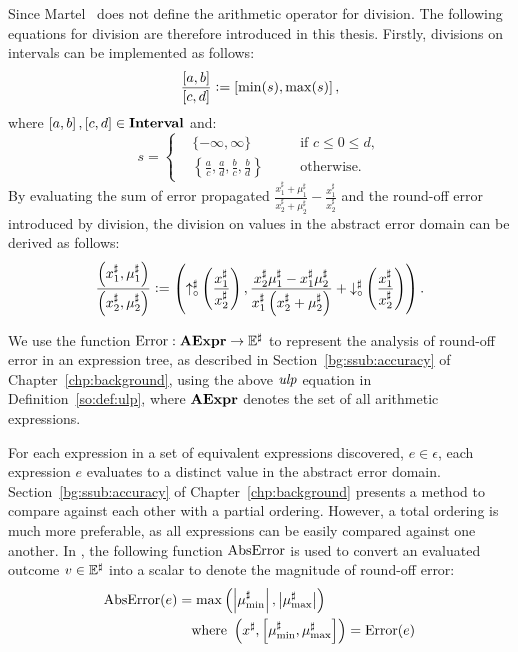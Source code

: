 Since Martel~\cite{martel07} does not define the arithmetic operator for
division.  The following equations for division are therefore introduced in
this thesis.  Firstly, divisions on intervals can be implemented as follows:
\begin{equation}
    \frac{\left[{a}, {b}\right]}{\left[{c}, {d}\right]}
        \vcentcolon= \left[{\min(s)}, {\max(s)}\right],
\end{equation}
where $\left[{a}, {b}\right], \left[{c}, {d}\right] \in \mathbf{Interval}$ and:
\begin{equation}
    s = \left\{
    \begin{aligned}
        & \{ -\infty, \infty \}
            && \text{if~} c \leq 0 \leq d, \\
        & \left\{
            \frac{a}{c}, \frac{a}{d}, \frac{b}{c}, \frac{b}{d}
        \right\}
            \quad && \text{otherwise}.
    \end{aligned}
    \right.
\end{equation}
By evaluating the sum of error propagated $\frac{ x^\sharp_1 + \mu^\sharp_1 }{
x^\sharp_2 + \mu^\sharp_2 } - \frac{x^\sharp_1}{x^\sharp_2}$ and the round-off
error introduced by division, the division on values in the abstract error
domain can be derived as follows:
\begin{equation}
    \frac{
        \left( x^\sharp_1, \mu^\sharp_1 \right)
    }{
        \left( x^\sharp_2, \mu^\sharp_2 \right)
    }
    \vcentcolon= \left(
            \operatorname{\uparrow^\sharp_\circ}\left(\frac{x^\sharp_1}{x^\sharp_2}\right),
            \frac{
                x^\sharp_2 \mu^\sharp_1 - x^\sharp_1 \mu^\sharp_2
            }{
                x^\sharp_1 \left( x^\sharp_2 + \mu^\sharp_2 \right)
            } + \operatorname{\downarrow^\sharp_\circ}\left(\frac{x^\sharp_1}{x^\sharp_2}\right)
        \right).
\end{equation}

We use the function $\operatorname{\mathrm{Error}}: \mathbf{AExpr}\to\mathbb{E}^\sharp$ to represent the
analysis of round-off error in an expression tree, as described in
Section~\ref{bg:ssub:accuracy} of Chapter~\ref{chp:background}, using the above
$\operatorname{\mathit{ulp}}$ equation in Definition~\ref{so:def:ulp}, where $\mathbf{AExpr}$ denotes the
set of all arithmetic expressions.

For each expression in a set of equivalent expressions discovered, $e \in
\epsilon$, each expression $e$ evaluates to a distinct value in the abstract
error domain.  Section~\ref{bg:ssub:accuracy} of Chapter~\ref{chp:background}
presents a method to compare against each other with a partial ordering.
However, a total ordering is much more preferable, as all expressions can
be easily compared against one another.  In \soap, the following function
$\operatorname{\mathrm{AbsError}}$ is used to convert an evaluated outcome $v \in \mathbb{E}^\sharp$ into a
scalar to denote the magnitude of round-off error:
\begin{equation}
    \begin{aligned}
        \operatorname{\mathrm{AbsError}}(e) &= \max\left(
            \left| \mu^\sharp_{\min} \right|,
            \left| \mu^\sharp_{\max} \right|
        \right) \\
        & \quad \text{where~}
        \left(
            x^\sharp, \left[ \mu^\sharp_{\min}, \mu^\sharp_{\max} \right]
        \right) = \operatorname{\mathrm{Error}}(e)
    \end{aligned}
    \label{so:eq:abserr}
\end{equation}
